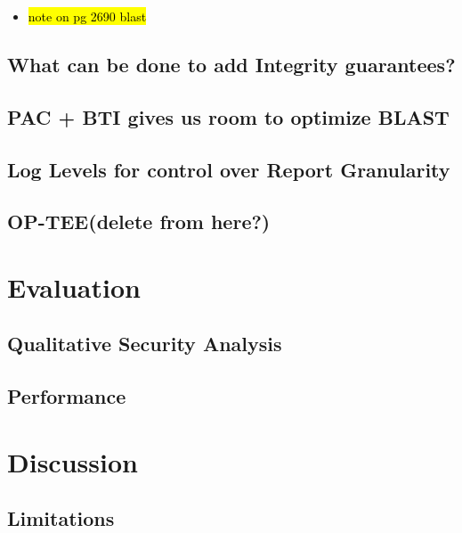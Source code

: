\documentclass[a4paper, nobind]{templates/ociamthesis}
\providecommand{\tightlist}{%
  \setlength{\itemsep}{0pt}\setlength{\parskip}{0pt}}
\begin{document}
\begin{itemize}
\tightlist
\item
  \hl{note on pg 2690 blast}
\end{itemize}

\section{What can be done to add Integrity guarantees?}\label{what-can-be-done-to-add-integrity-guarantees}

\section{PAC + BTI gives us room to optimize BLAST}\label{pac-bti-gives-us-room-to-optimize-blast}

\section{Log Levels for control over Report Granularity}\label{log-levels-for-control-over-report-granularity}

\section{OP-TEE(delete from here?)}\label{op-teedelete-from-here}

\chapter{Evaluation}\label{evaluation}

\minitoc 

\section{Qualitative Security Analysis}\label{qualitative-security-analysis}

\section{Performance}\label{performance}

\chapter{Discussion}\label{discussion}

\minitoc 

\section{Limitations}\label{limitations-2}
\end{document}
